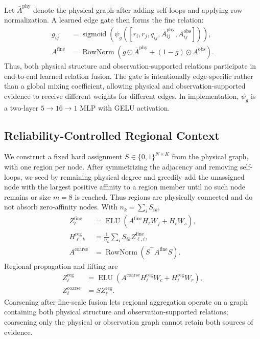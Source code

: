 \documentclass{article}
\newcommand{\obs}{\mathrm{obs}}
\newcommand{\phy}{\mathrm{phy}}
\newcommand{\fine}{\mathrm{fine}}
\newcommand{\coarse}{\mathrm{coarse}}
\newcommand{\reg}{\mathrm{reg}}
\newcommand{\norm}{\operatorname{RowNorm}}
\newcommand{\sigmoid}{\operatorname{sigmoid}}
\begin{document}
Let $\bar A^{\phy}$ denote the physical graph after adding self-loops and applying row normalization. A learned edge gate then forms the fine relation:
\begin{align}
g_{ij}&=\sigmoid\!\left(\psi_g([r_i,r_j,q_{ij},\bar A^{\phy}_{ij},A^{\obs}_{ij}])\right),\\
A^{\fine}&=\norm\!\left(g\odot\bar A^{\phy}+(1-g)\odot A^{\obs}\right).
\end{align}
Thus, both physical structure and observation-supported relations participate in end-to-end learned relation fusion. The gate is intentionally edge-specific rather than a global mixing coefficient, allowing physical and observation-supported evidence to receive different weights for different edges. In implementation, $\psi_g$ is a two-layer $5\!\rightarrow\!16\!\rightarrow\!1$ MLP with GELU activation.

\subsection{Reliability-Controlled Regional Context}

We construct a fixed hard assignment $S\in\{0,1\}^{N\times K}$ from the physical graph, with one region per node. After symmetrizing the adjacency and removing self-loops, we seed by remaining physical degree and greedily add the unassigned node with the largest positive affinity to a region member until no such node remains or size $m=8$ is reached. Thus regions are physically connected and do not absorb zero-affinity nodes. With $n_k=\sum_iS_{ik}$,
\begin{align}
Z^{\fine}_{\ell}&=\operatorname{ELU}(A^{\fine}H_{\ell}W_f+H_{\ell}W_s),\\
H^{\reg}_{\ell,k}&=\frac{1}{n_k}\sum_iS_{ik}Z^{\fine}_{\ell,i},\\
A^{\coarse}&=\norm(S^\top A^{\fine}S).
\end{align}
Regional propagation and lifting are
\begin{align}
Z^{\reg}_{\ell}&=\operatorname{ELU}(A^{\coarse}H^{\reg}_{\ell}W_c+H^{\reg}_{\ell}W_r),\\
Z^{\coarse}_{\ell}&=SZ^{\reg}_{\ell}.
\end{align}
Coarsening after fine-scale fusion lets regional aggregation operate on a graph containing both physical structure and observation-supported relations; coarsening only the physical or observation graph cannot retain both sources of evidence.
\end{document}
